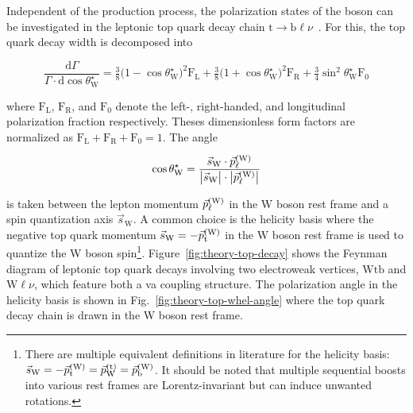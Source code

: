Independent of the production process, the polarization states of the \wboson boson can be investigated in the leptonic top quark decay chain $\mathrm{t}\to\mathrm{b}\ell\nu$~\cite{AguilarSaavedra:2010nx}. For this, the top quark decay width is decomposed into

\begin{equation}
\frac{\mathrm{d}\Gamma}{\Gamma\cdot\mathrm{d}\cos\theta^\star_\mathrm{W}}=\tfrac{3}{8}\big(1-\cos\theta^\star_\mathrm{W}\big)^{2}\mathrm{F}_\mathrm{L}+\tfrac{3}{8}\big(1+\cos\theta^\star_\mathrm{W}\big)^{2}\mathrm{F}_\mathrm{R}+\tfrac{3}{4}\sin^{2}\theta^\star_\mathrm{W}\mathrm{F}_{0} \label{eq:theory-diff-whel-fractions}
\end{equation}

where $\mathrm{F}_\mathrm{L}$, $\mathrm{F}_\mathrm{R}$, and $\mathrm{F}_{0}$ denote the left-, right-handed, and longitudinal polarization fraction respectively. Theses dimensionless form factors are normalized as $\mathrm{F}_\mathrm{L}+\mathrm{F}_\mathrm{R}+\mathrm{F}_{0}=1$. The angle 

\begin{equation}
\cos\theta^\star_\mathrm{W}=\frac{\vec{s}_\mathrm{W}\cdot\vec{p}_{\ell}^\scriptn{\mathrm{(W)}}}{\big|\vec{s}_\mathrm{W}\big|\cdot\big|\vec{p}_{\ell}^\scriptn{\mathrm{(W)}}\big|}
\end{equation}

is taken between the lepton momentum $\vec{p}_{\ell}^\scriptn{\mathrm{(W)}}$ in the W boson rest frame and a spin quantization axis $\vec{s}_\mathrm{W}$. A common choice is the helicity basis where the negative top quark momentum $\vec{s}_\mathrm{W}=-\vec{p}_\mathrm{t}^\scriptn{\mathrm{(W)}}$ in the $\mathrm{W}$ boson rest frame is used to quantize the W boson spin\footnote{There are multiple equivalent definitions in literature for the helicity basis: $\vec{s}_\mathrm{W}=-\vec{p}_\mathrm{t}^\scriptn{\mathrm{(W)}}=\vec{p}_\mathrm{W}^\scriptn{\mathrm{(t)}}=\vec{p}_\mathrm{b}^\scriptn{\mathrm{(W)}}$. It should be noted that multiple sequential boosts into various rest frames are Lorentz-invariant but can induce unwanted rotations.}. Figure~\ref{fig:theory-top-decay} shows the Feynman diagram of leptonic top quark decays involving two electroweak vertices, $\mathrm{Wtb}$ and $\mathrm{W}\ell\nu$, which feature both a \gls{va} coupling structure. The polarization angle in the helicity basis is shown in Fig.~\ref{fig:theory-top-whel-angle} where the top quark decay chain is drawn in the W boson rest frame.

